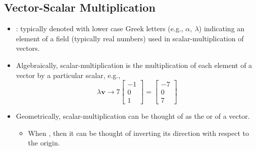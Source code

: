 \begin{itemize}
  \subsection{Vector-Scalar Multiplication}\label{Vector-Scalar Multiplication}
  \begin{itemize}
    \item {}: typically denoted with lower case Greek letters (e.g., \(\alpha,~\lambda \)) indicating an element of a field (typically real numbers) used in scalar-multiplication of vectors. 
    \item Algebraically, scalar-multiplication is the multiplication of each element of a vector by a particular scalar, e.g.,
    \[%
    \lambda \bm{v} \rightarrow 7 \begin{bmatrix}
      -1 \\
      0 \\
      1 \
    \end{bmatrix} = \begin{bmatrix}
      -7 \\
      0 \\
      7 \
    \end{bmatrix}
    \]%
    \item Geometrically, scalar-multiplication can be thought of as the  or  of a vector.
    \begin{itemize}
      \item When \bbb{\(\lambda \) < 0}, then it can be thought of inverting its direction with respect to the origin.  
    \end{itemize}
  \end{itemize}  
\end{itemize}
  

